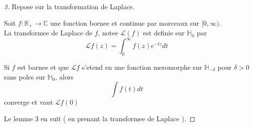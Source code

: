 \documentclass[../main.tex]{subfiles}
\begin{document}
\begin{proof}[3]
Repose sur la transformation de Laplace.
\begin{defn}
	Soit $f: \mathbb{R}_+ \to \mathbb{C} $ une fonction bornee et continue par morceaux sur $[0, \infty )$.\\
	La transformee de Laplace de $f$, notee $ \mathcal{L}( f) $ est definie sur $ \mathbb{H}_0$ par
	\[ 
	\mathcal{L} f( z) = \int_{ 0  }^{ \infty  } f( z) e^{- tz} dt
	\]
		
\end{defn}
\begin{thm}
Si $f$ est bornee et que $ \mathcal{L}f$ s'etend en une fonction meromorphe sur $ \mathbb{H}_{-\delta} $ pour $\delta>0$ sans poles sur $ \mathbb{H}_0$, alors 
\[ 
\int f( t) dt
\]
converge et vaut $\mathcal{L}f( 0) $ 
\end{thm}
Le lemme 3 en suit ( en prenant la transformee de Laplace ).
\end{proof}

	
\end{document}
